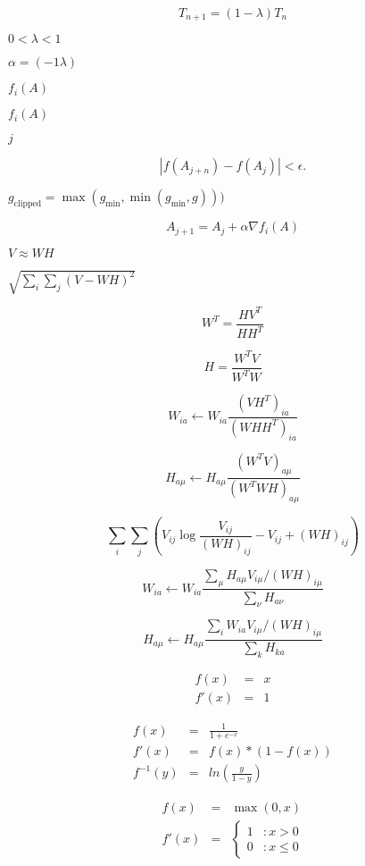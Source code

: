\documentclass{article}
\begin{document}
\[ T_{n+1} = (1-\lambda) T_{n} \]
\pagebreak

$ 0<\lambda<1 $
\pagebreak

$ \alpha = (-1 \lambda) $
\pagebreak

$ f_i(A) $
\pagebreak

$ f_i(A)$
\pagebreak

$ j$
\pagebreak

\[ | f(A_{j + n}) - f(A_j) | < \epsilon. \]
\pagebreak

$ g_{\text{clipped}} = \max(g_{\text{min}}, \min(g_{\text{min}}, g))) $
\pagebreak

\[ A_{j + 1} = A_j + \alpha \nabla f_i(A) \]
\pagebreak

$ V \approx WH $
\pagebreak

$ \sqrt{\sum_i \sum_j(V-WH)^2} $
\pagebreak

\[ W^T = \frac{H V^T}{H H^T} \]
\pagebreak

\[ H = \frac{W^T V}{W^T W} \]
\pagebreak

\[ W_{ia} \leftarrow W_{ia} \frac{(VH^T)_{ia}}{(WHH^T)_{ia}} \]
\pagebreak

\[ H_{a\mu} \leftarrow H_{a\mu} \frac{(W^T V)_{a\mu}}{(W^T WH)_{a\mu}} \]
\pagebreak

\[ \sum_i \sum_j (V_{ij} \log\frac{V_{ij}}{(W H)_{ij}} - V_{ij} + (W H)_{ij}) \]
\pagebreak

\[ W_{ia} \leftarrow W_{ia} \frac{\sum_{\mu} H_{a\mu} V_{i\mu} / (W H)_{i\mu}} {\sum_{\nu} H_{a\nu}} \]
\pagebreak

\[ H_{a\mu} \leftarrow H_{a\mu} \frac{\sum_{i} W_{ia} V_{i\mu}/(WH)_{i\mu}} {\sum_{k} H_{ka}} \]
\pagebreak

\begin{eqnarray*} f(x) &=& x \\ f'(x) &=& 1 \end{eqnarray*}
\pagebreak

\begin{eqnarray*} f(x) &=& \frac{1}{1 + e^{-x}} \\ f'(x) &=& f(x) * (1 - f(x)) \\ f^{-1}(y) &=& ln(\frac{y}{1-y}) \end{eqnarray*}
\pagebreak

\begin{eqnarray*} f(x) &=& \max(0, x) \\ f'(x) &=& \left\{ \begin{array}{lr} 1 & : x > 0 \\ 0 & : x \le 0 \end{array} \right. \end{eqnarray*}
\pagebreak
\end{document}
